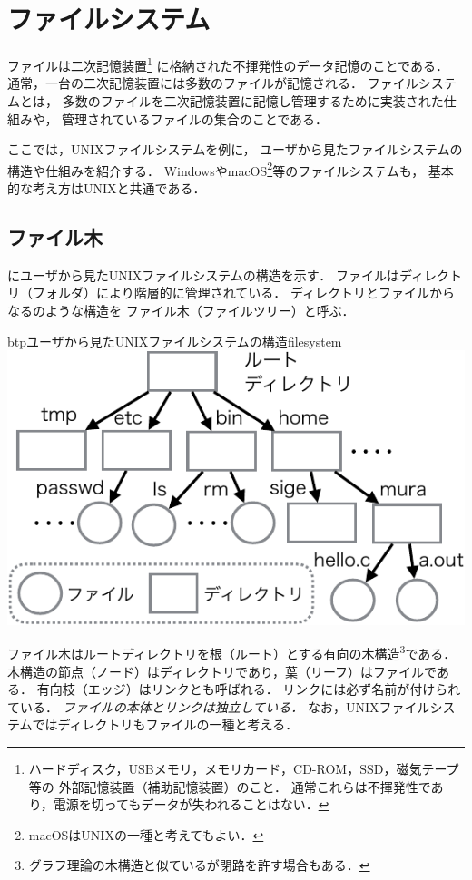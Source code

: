 \chapter{ファイルシステム}
ファイルは二次記憶装置\footnote{
ハードディスク，USBメモリ，メモリカード，CD-ROM，SSD，磁気テープ等の
外部記憶装置（補助記憶装置）のこと．
通常これらは不揮発性であり，電源を切ってもデータが失われることはない．}
に格納された不揮発性のデータ記憶のことである．
通常，一台の二次記憶装置には多数のファイルが記憶される．
ファイルシステムとは，
多数のファイルを二次記憶装置に記憶し管理するために実装された仕組みや，
管理されているファイルの集合のことである．

ここでは，UNIXファイルシステムを例に，
ユーザから見たファイルシステムの構造や仕組みを紹介する．
WindowsやmacOS\footnote{macOSはUNIXの一種と考えてもよい．
}等のファイルシステムも，
基本的な考え方はUNIXと共通である．

\section{ファイル木}
にユーザから見たUNIXファイルシステムの構造を示す．
ファイルはディレクトリ（フォルダ）により階層的に管理されている．
ディレクトリとファイルからなるのような構造を
ファイル木（ファイルツリー）と呼ぶ．

\begin{myfig}{btp}{ユーザから見たUNIXファイルシステムの構造}{filesystem}
\includegraphics[scale=1.0]{Fig/FileSystem-crop.pdf}
\end{myfig}

ファイル木はルートディレクトリを根（ルート）とする有向の木構造\footnote{
グラフ理論の木構造と似ているが閉路を許す場合もある．}である．
木構造の節点（ノード）はディレクトリであり，葉（リーフ）はファイルである．
有向枝（エッジ）はリンクとも呼ばれる．
リンクには必ず名前が付けられている．
\emph{ファイルの本体とリンクは独立している．}
なお，UNIXファイルシステムではディレクトリもファイルの一種と考える．

